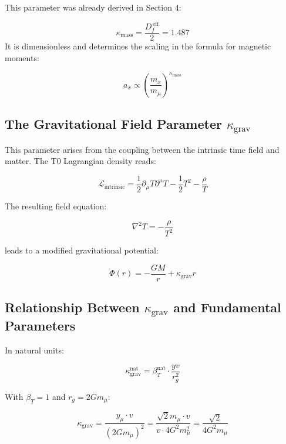 	This parameter was already derived in Section 4:
	
	\begin{equation}
		\kappa_{\text{mass}} = \frac{D_f^{\,\text{eff}}}{2} = 1.487
	\end{equation}
	It is dimensionless and determines the scaling in the formula for magnetic moments:
	
	\begin{equation}
		a_x \propto \left(\frac{m_x}{m_\mu}\right)^{\kappa_{\text{mass}}}
	\end{equation}
	
	\subsection{The Gravitational Field Parameter $\kappa_{\text{grav}}$}
	
	This parameter arises from the coupling between the intrinsic time field and matter. The T0 Lagrangian density reads:
	
	\begin{equation}
		\mathcal{L}_{\text{intrinsic}} = \frac{1}{2}\partial_\mu T \partial^\mu T - \frac{1}{2}T^2 - \frac{\rho}{T}
	\end{equation}
	
	The resulting field equation:
	
	\begin{equation}
		\nabla^2 T = -\frac{\rho}{T^2}
	\end{equation}
	
	leads to a modified gravitational potential:
	
	\begin{equation}
		\Phi(r) = -\frac{GM}{r} + \kappa_{\text{grav}} r
	\end{equation}
	
	\subsection{Relationship Between $\kappa_{\text{grav}}$ and Fundamental Parameters}
	
	In natural units:
	
	\begin{equation}
		\kappa_{\text{grav}}^{\text{nat}} = \beta_T^{\text{nat}} \cdot \frac{yv}{r_g^2}
	\end{equation}
	
	With $\beta_T = 1$ and $r_g = 2Gm_\mu$:
	
	\begin{equation}
		\kappa_{\text{grav}} = \frac{y_\mu \cdot v}{(2Gm_\mu)^2} = \frac{\sqrt{2} m_\mu \cdot v}{v \cdot 4G^2m_\mu^2} = \frac{\sqrt{2}}{4G^2m_\mu}
	\end{equation}
	
